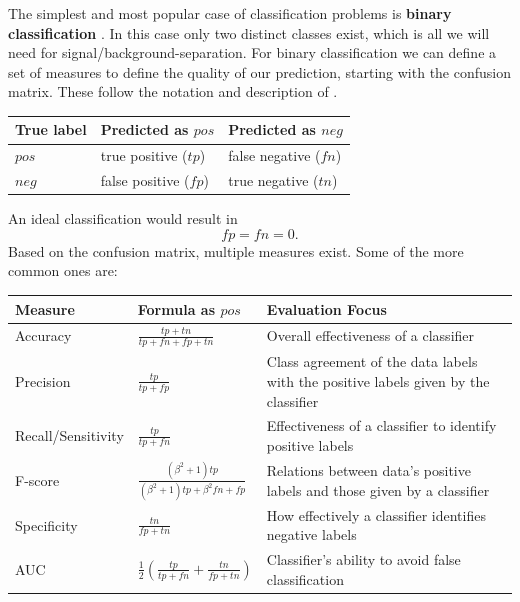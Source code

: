 The simplest and most popular case of classification problems
is \textbf{binary classification} \cite{sokolova2009systematic}.
In this case only two distinct
classes exist, which is all we will need for signal/background-separation.
For binary classification we can define a set of measures
to define the quality of our prediction, starting with the confusion matrix.
These follow the notation and description of \cite{sokolova2009systematic}.

\begin{center}
    \begin{tabular}{ | l | l | l |}
    True label & Predicted as $pos$ & Predicted as $neg$ \\ \hline
    $pos$ & true positive ($tp$) & false negative ($fn$) \\ \hline
    $neg$ & false positive ($fp$) & true negative ($tn$) \\ \hline
    \end{tabular}
\end{center}

An ideal classification would result in
\begin{equation*}
  fp = fn = 0.
\end{equation*}
Based on the confusion matrix, multiple measures exist.
Some of the more common ones are:

\begin{center}
    \begin{tabular}{ | l | l | l |}
    Measure & Formula as $pos$ & Evaluation Focus \\ \hline
    Accuracy & $\frac{tp+tn}{tp+fn+fp+tn}$ & Overall effectiveness of a classifier \\ \hline
    Precision & $\frac{tp}{tp+fp}$ & Class agreement of the data labels with the positive labels given by the classifier \\ \hline
    Recall/Sensitivity & $\frac{tp}{tp+fn}$ & Effectiveness of a classifier to identify positive labels \\ \hline
    F-score & $\frac{(\beta^2+1)tp}{(\beta^2+1)tp+\beta^2fn+fp}$ & Relations between data’s positive labels and those given by a classifier \\ \hline
    Specificity & $\frac{tn}{fp+tn}$ & How effectively a classifier identifies negative labels \\ \hline
    AUC & $\frac{1}{2}(\frac{tp}{tp+fn}+\frac{tn}{fp+tn})$ & Classifier’s ability to avoid false classification \\ \hline
    \end{tabular}
\end{center}

